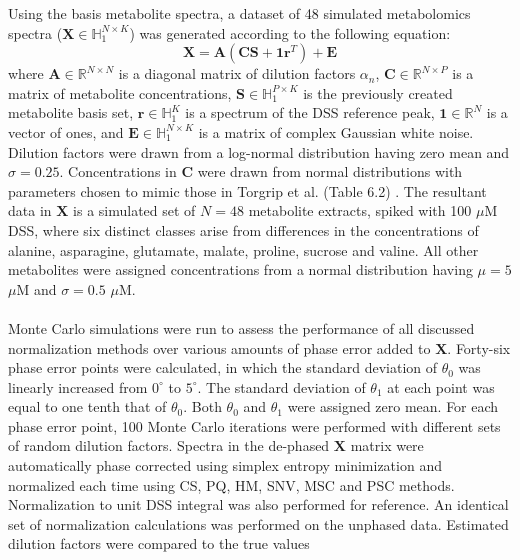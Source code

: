 \begin{doublespace}
Using the basis metabolite spectra, a dataset of 48 simulated metabolomics
spectra ($\mathbf{X} \in \mathbb{H}_1^{N \times K}$) was generated according
to the following equation:
\begin{equation}
\mathbf{X}
 = \mathbf{A} \left( \mathbf{C} \mathbf{S} + \mathbf{1} \mathbf{r}^T \right)
 + \mathbf{E}
\end{equation}
where $\mathbf{A} \in \mathbb{R}^{N \times N}$ is a diagonal matrix of dilution
factors $\alpha_n$, $\mathbf{C} \in \mathbb{R}^{N \times P}$ is a matrix of
metabolite concentrations, $\mathbf{S} \in \mathbb{H}_1^{P \times K}$ is the
previously created metabolite basis set, $\mathbf{r} \in \mathbb{H}_1^K$ is a
spectrum of the DSS reference peak, $\mathbf{1} \in \mathbb{R}^N$ is a vector
of ones, and $\mathbf{E} \in \mathbb{H}_1^{N \times K}$ is a matrix of complex
Gaussian white noise. Dilution factors were drawn from a log-normal
distribution having zero mean and $\sigma = 0.25$. Concentrations in
$\mathbf{C}$ were drawn from normal distributions with parameters chosen to
mimic those in Torgrip et al. (Table 6.2) \cite{torgrip:metab2008}. The
resultant data in $\mathbf{X}$ is a simulated set of $N = 48$ metabolite
extracts, spiked with 100 $\mu$M DSS, where six distinct classes arise from
differences in the concentrations of alanine, asparagine, glutamate, malate,
proline, sucrose and valine. All other metabolites were assigned concentrations
from a normal distribution having $\mu = 5$ $\mu$M and $\sigma = 0.5$ $\mu$M.
\\\\
Monte Carlo simulations were run to assess the performance of all discussed
normalization methods over various amounts of phase error added to
$\mathbf{X}$. Forty-six phase error points were calculated, in which the
standard deviation of $\theta_0$ was linearly increased from $0^\circ$ to
$5^\circ$. The standard deviation of $\theta_1$ at each point was equal to
one tenth that of $\theta_0$. Both $\theta_0$ and $\theta_1$ were assigned
zero mean. For each phase error point, 100 Monte Carlo iterations were
performed with different sets of random dilution factors. Spectra in the
de-phased $\mathbf{X}$ matrix were automatically phase corrected using simplex
entropy minimization and normalized each time using CS, PQ, HM, SNV, MSC and
PSC methods. Normalization to unit DSS integral was also performed for
reference. An identical set of normalization calculations was performed on the
unphased data. Estimated dilution factors were compared to the true values

\end{doublespace}

